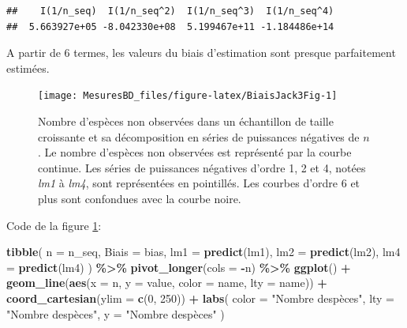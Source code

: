 \documentclass[
  11pt,
  american,
  a4paper,
  extrafontsizes,onecolumn,openright
  ]{memoir}
\newenvironment{Shaded}{\begin{snugshade}}{\end{snugshade}}
\newcommand{\AttributeTok}[1]{\textcolor[rgb]{0.13,0.29,0.53}{#1}}
\newcommand{\DecValTok}[1]{\textcolor[rgb]{0.00,0.00,0.81}{#1}}
\newcommand{\FunctionTok}[1]{\textcolor[rgb]{0.13,0.29,0.53}{\textbf{#1}}}
\newcommand{\NormalTok}[1]{#1}
\newcommand{\SpecialCharTok}[1]{\textcolor[rgb]{0.81,0.36,0.00}{\textbf{#1}}}
\newcommand{\StringTok}[1]{\textcolor[rgb]{0.31,0.60,0.02}{#1}}
\newlength{\rf}
\begin{document}
\begin{verbatim}
##    I(1/n_seq)  I(1/n_seq^2)  I(1/n_seq^3)  I(1/n_seq^4) 
##  5.663927e+05 -8.042330e+08  5.199467e+11 -1.184486e+14
\end{verbatim}

\normalsize
A partir de 6 termes, les valeurs du biais d'estimation sont presque parfaitement estimées.



\scriptsize

\begin{figure}

{\centering \texttt{[image: MesuresBD\_files/figure-latex/BiaisJack3Fig-1]} 

}

\caption{Nombre d'espèces non observées dans un échantillon de taille croissante et sa décomposition en séries de puissances négatives de \(n\). Le nombre d'espèces non observées est représenté par la courbe continue. Les séries de puissances négatives d'ordre 1, 2 et 4, notées \emph{lm1} à \emph{lm4}, sont représentées en pointillés. Les courbes d'ordre 6 et plus sont confondues avec la courbe noire.}\label{fig:BiaisJack3Fig}
\end{figure}

\normalsize

Code de la figure \ref{fig:BiaisJack3Fig}:

\scriptsize

\begin{Shaded}
\begin{Highlighting}[]
\FunctionTok{tibble}\NormalTok{(}
  \AttributeTok{n =}\NormalTok{ n\_seq, }
  \AttributeTok{Biais =}\NormalTok{ bias, }
  \AttributeTok{lm1 =} \FunctionTok{predict}\NormalTok{(lm1),}
  \AttributeTok{lm2 =} \FunctionTok{predict}\NormalTok{(lm2), }
  \AttributeTok{lm4 =} \FunctionTok{predict}\NormalTok{(lm4)}
\NormalTok{) }\SpecialCharTok{\%\textgreater{}\%} 
  \FunctionTok{pivot\_longer}\NormalTok{(}\AttributeTok{cols =} \SpecialCharTok{{-}}\NormalTok{n) }\SpecialCharTok{\%\textgreater{}\%} 
  \FunctionTok{ggplot}\NormalTok{() }\SpecialCharTok{+}
    \FunctionTok{geom\_line}\NormalTok{(}\FunctionTok{aes}\NormalTok{(}\AttributeTok{x =}\NormalTok{ n, }\AttributeTok{y =}\NormalTok{ value, }\AttributeTok{color =}\NormalTok{ name, }\AttributeTok{lty =}\NormalTok{ name)) }\SpecialCharTok{+}
    \FunctionTok{coord\_cartesian}\NormalTok{(}\AttributeTok{ylim =} \FunctionTok{c}\NormalTok{(}\DecValTok{0}\NormalTok{, }\DecValTok{250}\NormalTok{)) }\SpecialCharTok{+}
    \FunctionTok{labs}\NormalTok{(}
      \AttributeTok{color =} \StringTok{"Nombre d\textquotesingle{}espèces"}\NormalTok{, }
      \AttributeTok{lty =} \StringTok{"Nombre d\textquotesingle{}espèces"}\NormalTok{,}
      \AttributeTok{y =} \StringTok{"Nombre d\textquotesingle{}espèces"}
\NormalTok{    )}
\end{Highlighting}
\end{Shaded}
\end{document}
